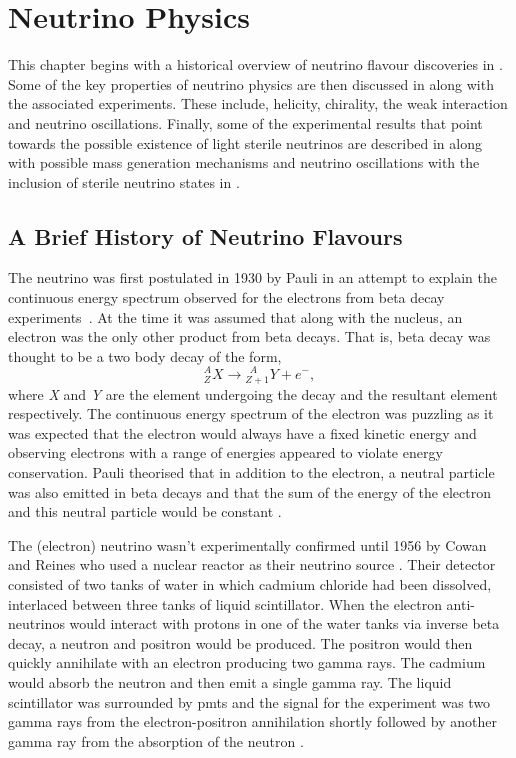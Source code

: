 \chapter{Neutrino Physics}
\label{chap:Neutrino Physics}

This chapter begins with a historical overview of neutrino flavour discoveries in . Some of the key properties of neutrino physics are then discussed in  along with the associated experiments. These include, helicity, chirality, the weak interaction and neutrino oscillations. Finally, some of the experimental results that point towards the possible existence of light sterile neutrinos are described in  along with possible mass generation mechanisms and neutrino oscillations with the inclusion of sterile neutrino states in .

\section{A Brief History of Neutrino Flavours}\label{sec:history_of_neutrino_flavours}

The neutrino was first postulated in 1930 by Pauli in an attempt to explain the continuous energy spectrum observed for the electrons from beta decay experiments~\cite{Pauli_letter}. At the time it was assumed that along with the nucleus, an electron was the only other product from beta decays. That is, beta decay was thought to be a two body decay of the form,
\begin{equation}
    {^A_Z}X \longrightarrow {^{\ \ A}_{Z+1}}Y + e^-,
\end{equation}
where \textit{X} and \textit{Y} are the element undergoing the decay and the resultant element respectively. The continuous energy spectrum of the electron was puzzling as it was expected that the electron would always have a fixed kinetic energy and observing electrons with a range of energies appeared to violate energy conservation. Pauli theorised that in addition to the electron, a neutral particle was also emitted in beta decays and that the sum of the energy of the electron and this neutral particle would be constant \cite{Pauli_letter}.

The (electron) neutrino wasn't experimentally confirmed until 1956 by Cowan and Reines who used a nuclear reactor as their neutrino source \cite{cowan_and_reines_paper}. Their detector consisted of two tanks of water in which cadmium chloride had been dissolved, interlaced between three tanks of liquid scintillator. When the electron anti-neutrinos would interact with protons in one of the water tanks via inverse beta decay, a neutron and positron would be produced. The positron would then quickly annihilate with an electron producing two gamma rays. The cadmium would absorb the neutron and then emit a single gamma ray. The liquid scintillator was surrounded by \Glspl{pmt} and the signal for the experiment was two gamma rays from the electron-positron annihilation shortly followed by another gamma ray from the absorption of the neutron \cite{cowan_and_reines_paper}.

